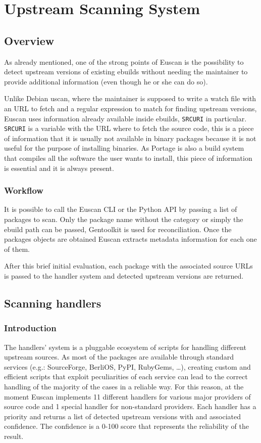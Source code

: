 \chapter{Upstream Scanning System}

\section{Overview}
As already mentioned, one of the strong points of Euscan is the possibility to detect upstream versions of existing ebuilds without needing the maintainer to provide additional information (even though he or she can do so).

Unlike Debian uscan, where the maintainer is supposed to write a watch file with an URL to fetch and a regular expression to match for finding upstream versions, Euscan uses information already available inside ebuilds, \texttt{SRC\textunderscore URI} in particular. \texttt{SRC\textunderscore URI} is a variable with the URL where to fetch the source code, this is a piece of information that it is usually not available in binary packages because it is not useful for the purpose of installing binaries. As Portage is also a build system that compiles all the software the user wants to install, this piece of information is essential and it is always present.

\subsection{Workflow}
It is possible to call the Euscan CLI or the Python API by passing a list of packages to scan. Only the package name without the category or simply the ebuild path can be passed, Gentoolkit is used for reconciliation. Once the packages objects are obtained Euscan extracts metadata information for each one of them.

After this brief initial evaluation, each package with the associated source URLs is passed to the handler system and detected upstream versions are returned.


\section{Scanning handlers}
\label{sec:handlers}

\subsection{Introduction}
The handlers' system is a pluggable ecosystem of scripts for handling different upstream sources. As most of the packages are available through standard services (e.g.: SourceForge, BerliOS, PyPI, RubyGems, \ldots), creating custom and efficient scripts that exploit peculiarities of each service can lead to the correct handling of the majority of the cases in a reliable way. For this reason, at the moment Euscan implements 11 different handlers for various major providers of source code and 1 special handler for non-standard providers.
Each handler has a priority and returns a list of detected upstream versions with and associated confidence. The confidence is a 0-100 score that represents the reliability of the result.

